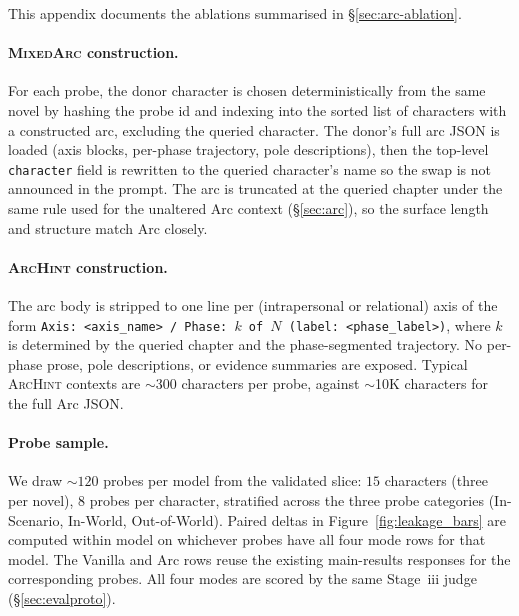 \documentclass{llmxive}
\begin{document}
This appendix documents the ablations summarised in \S\ref{sec:arc-ablation}.

\paragraph{\textsc{MixedArc} construction.}
For each probe, the donor character is chosen deterministically from the same novel by hashing the probe id and indexing into the sorted list of characters with a constructed arc, excluding the queried character. The donor's full arc JSON is loaded (axis blocks, per-phase trajectory, pole descriptions), then the top-level \texttt{character} field is rewritten to the queried character's name so the swap is not announced in the prompt. The arc is truncated at the queried chapter under the same rule used for the unaltered Arc context (\S\ref{sec:arc}), so the surface length and structure match Arc closely.

\paragraph{\textsc{ArcHint} construction.}
The arc body is stripped to one line per (intrapersonal or relational) axis of the form \texttt{Axis: <axis\_name> / Phase: $k$ of $N$ (label: <phase\_label>)}, where $k$ is determined by the queried chapter and the phase-segmented trajectory. No per-phase prose, pole descriptions, or evidence summaries are exposed. Typical \textsc{ArcHint} contexts are $\sim$300 characters per probe, against $\sim$10K characters for the full Arc JSON.

\paragraph{Probe sample.}
We draw $\sim 120$ probes per model from the validated slice: $15$ characters (three per novel), $8$ probes per character, stratified across the three probe categories (In-Scenario, In-World, Out-of-World). Paired deltas in Figure~\ref{fig:leakage_bars} are computed within model on whichever probes have all four mode rows for that model. The Vanilla and Arc rows reuse the existing main-results responses for the corresponding probes. All four modes are scored by the same Stage~iii judge (\S\ref{sec:evalproto}).
\end{document}
